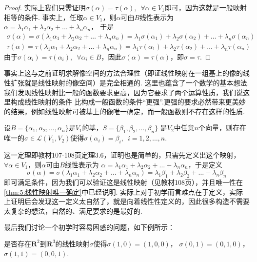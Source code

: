 \begin{proof}
    实际上我们只需证明$\sigma(\alpha)=\tau(\alpha),\enspace\forall \alpha \in V_1$即可，因为这就是一般映射相等的条件.
    事实上，任取$\alpha \in V_1$，则$\alpha$可由$B$线性表示为$\alpha=\lambda_1\alpha_1+\lambda_2\alpha_2+\ldots+\lambda_n\alpha_n$，
    于是
    \begin{gather*}
        \sigma(\alpha)=\sigma(\lambda_1\alpha_1+\lambda_2\alpha_2+\ldots+\lambda_n\alpha_n)=\lambda_1\sigma(\alpha_1)+\lambda_2\sigma(\alpha_2)+\ldots+\lambda_n\sigma(\alpha_n) \\
        \tau(\alpha)=\tau(\lambda_1\alpha_1+\lambda_2\alpha_2+\ldots+\lambda_n\alpha_n)=\lambda_1\tau(\alpha_1)+\lambda_2\tau(\alpha_2)+\ldots+\lambda_n\tau(\alpha_n)
    \end{gather*}
    由于$\sigma(\alpha_i)=\tau(\alpha_i),\enspace\forall \alpha_i \in B$，因此$\sigma(\alpha)=\tau(\alpha)$，即$\sigma=\tau$.
\end{proof}

事实上这与之前证明求解像空间的方法合理性（即证线性映射在一组基上的像的线性扩张就是线性映射的像空间）是完全相通的.
这里也蕴含了一个数学的基本想法.我们发现线性映射比一般的函数要求更高，因为它要求了两个运算性质，我们说这里构成线性映射的条件
比构成一般函数的条件``更强''.更强的要求必然带来更美妙的结果，例如线性映射可被基上的像唯一确定，而一般函数则不存在这样的性质.

\begin{theorem}\label{thm:5:线性映射构造}
    设$B=\{\alpha_1,\alpha_2,\ldots,\alpha_n\}$是$V_1$的基，$S=\{\beta_1,\beta_2,\ldots,\beta_n\}$
    是$V_2$中任意$n$个向量，则存在唯一的$\sigma\in \mathcal{L}(V_1,V_2)$使得$\sigma(\alpha_i)=\beta_i,\enspace i=1,2,\ldots,n$.
\end{theorem}
这一定理即教材107-108页定理3.6，证明也是简单的，只需先定义出这个映射，$\forall \alpha \in V_1$，则$\alpha$可由$B$线性表示为
$\alpha=\lambda_1\alpha_1+\lambda_2\alpha_2+\ldots+\lambda_n\alpha_n$，于是定义
\[\sigma(\alpha)=\sigma(\lambda_1\alpha_1+\lambda_2\alpha_2+\ldots+\lambda_n\alpha_n)=\lambda_1\beta_1+\lambda_2\beta_2+\ldots+\lambda_n\beta_n\]
即可满足条件，因为我们可以验证这是线性映射（见教材108页），并且唯一性在\autoref{thm:5:线性映射唯一确定}中已经说明.
实际上对于初学而言难点在于定义，实际上证明后会发现这一定义太自然了，就是向着线性性定义的，因此很多构造不需要太复杂的想法，自然的、满足要求的是最好的.

最后我们讨论一个初学时容易困惑的问题，如下例所示：
\begin{example}\label{ex:5:线性映射判断1}
    是否存在$\mathbf{R}^2$到$\mathbf{R}^3$的线性映射$\sigma$使得$\sigma(1,0)=(1,0,0)$，
	$\sigma(0,1)=(0,1,0)$，$\sigma(1,1)=(0,0,1)$.
\end{example}

